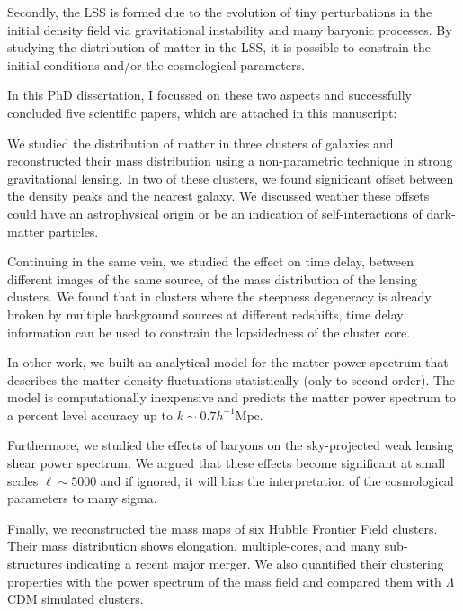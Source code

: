 \documentclass[
  11pt,
  twoside,
  openright,
  titlepage,
  headings=optiontoheadandtoc
]{scrbook}
\begin{document}
Secondly, the LSS is
formed due to the evolution
of tiny perturbations in the initial density field via gravitational
instability and many baryonic processes. By studying the
distribution of matter in the LSS, it is possible to constrain the initial
conditions and/or the cosmological parameters.

In this PhD dissertation, I focussed on these two aspects and successfully
concluded five scientific papers, which are attached in this manuscript:

We studied the distribution of matter in three clusters of galaxies
and reconstructed their mass distribution using a non-parametric technique in
strong gravitational lensing. In two of these clusters, we found significant offset
between the density peaks and the nearest galaxy. We discussed weather these offsets
could have an astrophysical origin or be an indication of self-interactions
of dark-matter particles.

Continuing in the same vein, we studied
the effect on time delay, between different images of the same source,
of the mass distribution of the lensing clusters. We found that in clusters
where the steepness degeneracy is already broken by multiple background sources
at different redshifts, time delay information can be used to constrain
the lopsidedness of the cluster core.

In other work, we built an analytical model for the matter power spectrum that
describes the matter density fluctuations statistically (only to second
order). The model is computationally inexpensive and predicts the
matter power spectrum to a percent level accuracy up to
$k\sim 0.7 h^{-1}\mathrm{Mpc}$.

Furthermore, we studied the effects of baryons on the sky-projected weak lensing
shear power spectrum. We argued that these effects become significant
at small scales $\ell \sim 5000$ and if ignored, it will bias the
interpretation of the cosmological parameters to many sigma.

Finally, we reconstructed the mass maps of six Hubble Frontier Field clusters.
Their mass distribution shows elongation, multiple-cores, and many sub-structures
indicating a recent major merger. We also quantified their clustering
properties with the power spectrum of the mass field and compared them
with $\Lambda$CDM simulated clusters.

\endgroup

\cleardoublepage
{}

\begingroup
\setlength{\parindent}{0pt}
\setlength{\parskip}{0.85em plus 0.15em minus 0.1em}
\end{document}
